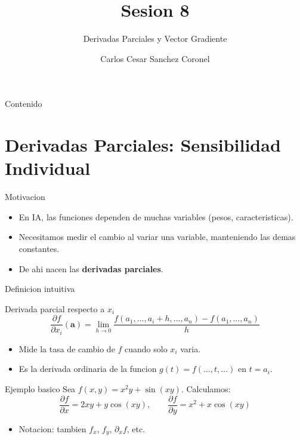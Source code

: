 \documentclass[aspectratio=169, 10pt, xcolor=table]{beamer}
\title[SESION 8 CALCULO]{\textbf{Sesion 8}}
\subtitle{Derivadas Parciales y Vector Gradiente}
\author[Prof. C. Sanchez]{Carlos Cesar Sanchez Coronel}
\institute{\textbf{CALCULO Y ALGEBRA LINEAL PARA IA}}
\date{}
\begin{document}
\begin{frame}
    \titlepage
\end{frame}

\begin{frame}{Contenido}
    \tableofcontents
\end{frame}

\section{Derivadas Parciales: Sensibilidad Individual}

\begin{frame}{Motivacion}
    \begin{itemize}
        \item En IA, las funciones dependen de muchas variables (pesos, caracteristicas).
        \item Necesitamos medir el cambio al variar una variable, manteniendo las demas constantes.
        \item De ahi nacen las \textbf{derivadas parciales}.
    \end{itemize}
\end{frame}

\begin{frame}{Definicion intuitiva}
    \begin{block}{Derivada parcial respecto a $x_i$}
        \[
        \frac{\partial f}{\partial x_i}(\mathbf{a}) = \lim_{h\to 0} \frac{f(a_1,\dots,a_i+h,\dots,a_n) - f(a_1,\dots,a_n)}{h}
        \]
    \end{block}
    \begin{itemize}
        \item Mide la tasa de cambio de $f$ cuando solo $x_i$ varia.
        \item Es la derivada ordinaria de la funcion $g(t)=f(\dots,t,\dots)$ en $t=a_i$.
    \end{itemize}
\end{frame}

\begin{frame}{Ejemplo basico}
    Sea $f(x,y)=x^2y + \sin(xy)$. Calculamos:
    \[
    \frac{\partial f}{\partial x} = 2xy + y\cos(xy),\qquad 
    \frac{\partial f}{\partial y} = x^2 + x\cos(xy)
    \]
    \vspace{0.3cm}
    \begin{itemize}
        \item Notacion: tambien $f_x$, $f_y$, $\partial_x f$, etc.
    \end{itemize}
\end{frame}
\end{document}
